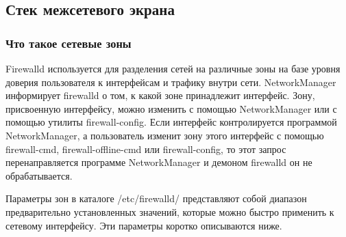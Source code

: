 \documentclass[a4paper,10pt,twoside]{article}
\begin{document}
\subsection{Стек межсетевого экрана}

\subsubsection{Что такое сетевые зоны}
Firewalld используется для разделения сетей на различные зоны на базе уровня доверия пользователя к интерфейсам и трафику внутри сети. NetworkManager информирует firewalld о том, к какой зоне принадлежит интерфейс. Зону, присвоенную интерфейсу, можно изменить с помощью  NetworkManager или с помощью утилиты firewall-config. Если интерфейс контролируется программой NetworkManager, а пользователь изменит зону этого интерфейс с помощью firewall-cmd, firewall-offline-cmd или firewall-config, то этот запрос перенаправляется программе NetworkManager и демоном firewalld он не обрабатывается. 


Параметры зон в каталоге /etc/firewalld/ представляют собой диапазон предварительно установленных значений, которые можно быстро применить к сетевому интерфейсу. Эти параметры коротко описываются ниже.
\end{document}
